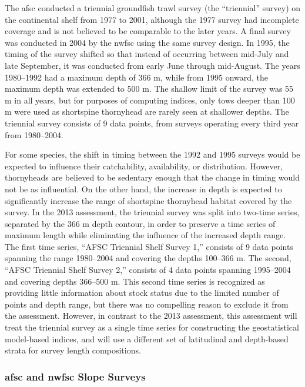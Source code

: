 \documentclass[11pt,
  english,
  letterpaper,
]{article}
\begin{document}
The \gls{afsc} conducted a triennial groundfish trawl survey (the ``triennial'' survey) on the continental shelf from 1977 to 2001, although the 1977 survey had incomplete coverage and is not believed to be comparable to the later years. A final survey was conducted in 2004 by the \gls{nwfsc} using the same survey design. In 1995, the timing of the survey shifted so that instead of occurring between mid-July and late September, it was conducted from early June through mid-August. The years 1980--1992 had a maximum depth of 366 m, while from 1995 onward, the maximum depth was extended to 500 m. The shallow limit of the survey was 55 m in all years, but for purposes of computing indices, only tows deeper than 100 m were used as shortspine thornyhead are rarely seen at shallower depths. The triennial survey consists of 9 data points, from surveys operating every third year from 1980--2004.

For some species, the shift in timing between the 1992 and 1995 surveys would be expected to influence their catchability, availability, or distribution. However, thornyheads are believed to be sedentary enough that the change in timing would not be as influential. On the other hand, the increase in depth is expected to significantly increase the range of shortspine thornyhead habitat covered by the survey. In the 2013 assessment, the triennial survey was split into two-time series, separated by the 366 m depth contour, in order to preserve a time series of maximum length while eliminating the influence of the increased depth range. The first time series, ``AFSC Triennial Shelf Survey 1,'' consists of 9 data points spanning the range 1980--2004 and covering the depths 100--366 m. The second, ``AFSC Triennial Shelf Survey 2,'' consists of 4 data points spanning 1995--2004 and covering depths 366--500 m. This second time series is recognized as providing little information about stock status due to the limited number of points and depth range, but there was no compelling reason to exclude it from the assessment. However, in contrast to the 2013 assessment, this assessment will treat the triennial survey as a single time series for constructing the geostatistical model-based indices, and will use a different set of latitudinal and depth-based strata for survey length compositions.

\hypertarget{and-slope-surveys}{%
\subsubsection{\texorpdfstring{\acrshort{afsc} and \acrshort{nwfsc} Slope Surveys}{ and  Slope Surveys}}\label{and-slope-surveys}}
\end{document}
